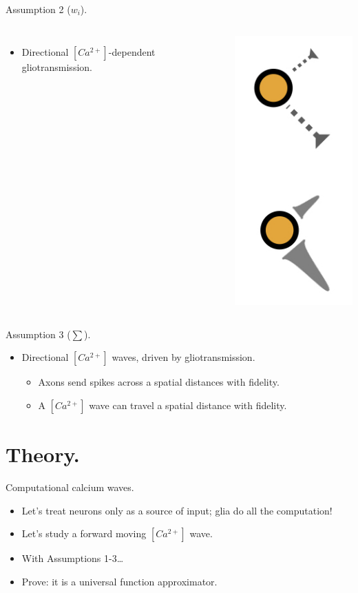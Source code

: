 \documentclass[10pt]{beamer}
\begin{document}
\begin{frame}[fragile]{Assumption 2 ($w_i$).}
\begin{columns}
\begin{itemize}
    \item \alert{Directional} $[Ca^{2+}]$-dependent gliotransmission.
\end{itemize}
    \centering
    \includegraphics[scale=0.4]{images/gliotrans.jpeg}
\end{columns}
\end{frame}

\begin{frame}[fragile]{Assumption 3 ($\sum$).}
\begin{itemize}
    \item \alert{Directional} $[Ca^{2+}]$ waves, driven by gliotransmission.
    \begin{itemize}
    \item Axons send spikes across a spatial distances with fidelity.
    \item A $[Ca^{2+}]$ wave can travel a spatial distance with fidelity.
    \end{itemize}
\end{itemize}
\end{frame}

\section[In theory.]{Theory.}
\begin{frame}[fragile]{Computational calcium waves.}
\begin{itemize}
\item Let's treat neurons only as a source of input; glia do all the computation!
\item Let's study a forward moving $[Ca^{2+}]$ wave.
\item With Assumptions 1-3\ldots
\item \alert{Prove}: it is a universal function approximator.
\end{itemize}
\end{frame}
\end{document}
